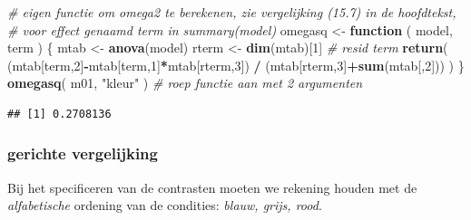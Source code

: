 \documentclass[
]{book}
\newenvironment{Shaded}{\begin{snugshade}}{\end{snugshade}}
\newcommand{\CommentTok}[1]{\textcolor[rgb]{0.56,0.35,0.01}{\textit{#1}}}
\newcommand{\ControlFlowTok}[1]{\textcolor[rgb]{0.13,0.29,0.53}{\textbf{#1}}}
\newcommand{\DecValTok}[1]{\textcolor[rgb]{0.00,0.00,0.81}{#1}}
\newcommand{\KeywordTok}[1]{\textcolor[rgb]{0.13,0.29,0.53}{\textbf{#1}}}
\newcommand{\NormalTok}[1]{#1}
\newcommand{\OperatorTok}[1]{\textcolor[rgb]{0.81,0.36,0.00}{\textbf{#1}}}
\newcommand{\StringTok}[1]{\textcolor[rgb]{0.31,0.60,0.02}{#1}}
\begin{document}
\begin{Shaded}
\begin{Highlighting}[]
\CommentTok{\# eigen functie om omega2 te berekenen, zie vergelijking (15.7) in de hoofdtekst, }
\CommentTok{\# voor effect genaamd \textasciigrave{}term\textasciigrave{} in summary(\textasciigrave{}model\textasciigrave{})}
\NormalTok{omegasq \textless{}{-}}\StringTok{ }\ControlFlowTok{function}\NormalTok{ ( model, term ) \{   }
\NormalTok{     mtab \textless{}{-}}\StringTok{ }\KeywordTok{anova}\NormalTok{(model)}
\NormalTok{     rterm \textless{}{-}}\StringTok{ }\KeywordTok{dim}\NormalTok{(mtab)[}\DecValTok{1}\NormalTok{] }\CommentTok{\# resid term}
     \KeywordTok{return}\NormalTok{( (mtab[term,}\DecValTok{2}\NormalTok{]}\OperatorTok{{-}}\NormalTok{mtab[term,}\DecValTok{1}\NormalTok{]}\OperatorTok{*}\NormalTok{mtab[rterm,}\DecValTok{3}\NormalTok{]) }\OperatorTok{/}\StringTok{ }
\StringTok{             }\NormalTok{(mtab[rterm,}\DecValTok{3}\NormalTok{]}\OperatorTok{+}\KeywordTok{sum}\NormalTok{(mtab[,}\DecValTok{2}\NormalTok{])) )}
\NormalTok{     \}}
\KeywordTok{omegasq}\NormalTok{( m01, }\StringTok{"kleur"}\NormalTok{ ) }\CommentTok{\# roep functie aan met 2 argumenten}
\end{Highlighting}
\end{Shaded}

\begin{verbatim}
## [1] 0.2708136
\end{verbatim}

\hypertarget{gerichte-vergelijking-2}{%
\subsubsection{gerichte vergelijking}\label{gerichte-vergelijking-2}}

Bij het specificeren van de contrasten moeten we rekening houden met de \emph{alfabetische} ordening van de condities: \emph{blauw, grijs, rood}.
\end{document}
